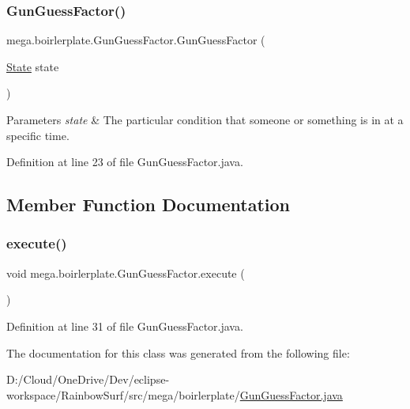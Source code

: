 \subsubsection{\texorpdfstring{Gun\+Guess\+Factor()}{GunGuessFactor()}}
{\footnotesize\ttfamily mega.\+boirlerplate.\+Gun\+Guess\+Factor.\+Gun\+Guess\+Factor (\begin{DoxyParamCaption}\item[{\hyperlink{classmega_1_1boirlerplate_1_1_state}{State}}]{state }\end{DoxyParamCaption})}


\begin{DoxyParams}{Parameters}
{\em state} & The particular condition that someone or something is in at a specific time. \\
\hline
\end{DoxyParams}


Definition at line 23 of file Gun\+Guess\+Factor.\+java.



\subsection{Member Function Documentation}
\mbox{\label{classmega_1_1boirlerplate_1_1_gun_guess_factor_ad85d1e803b5e48e4dd442bd2f00c4323}} 
\subsubsection{\texorpdfstring{execute()}{execute()}}
{\footnotesize\ttfamily void mega.\+boirlerplate.\+Gun\+Guess\+Factor.\+execute (\begin{DoxyParamCaption}{ }\end{DoxyParamCaption})}



Definition at line 31 of file Gun\+Guess\+Factor.\+java.



The documentation for this class was generated from the following file\+:\begin{DoxyCompactItemize}
\item 
D\+:/\+Cloud/\+One\+Drive/\+Dev/eclipse-\/workspace/\+Rainbow\+Surf/src/mega/boirlerplate/\hyperlink{_gun_guess_factor_8java}{Gun\+Guess\+Factor.\+java}\end{DoxyCompactItemize}
